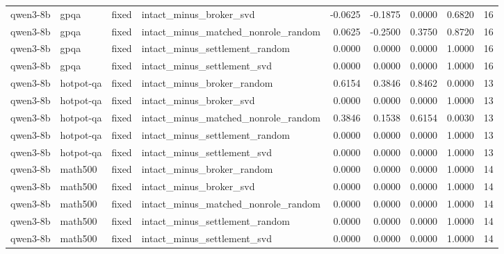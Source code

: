 \begin{table}[t]
\begin{tabular}{llllrrrrr}
qwen3-8b & gpqa & fixed & intact\_minus\_broker\_svd & -0.0625 & -0.1875 & 0.0000 & 0.6820 & 16 \\
qwen3-8b & gpqa & fixed & intact\_minus\_matched\_nonrole\_random & 0.0625 & -0.2500 & 0.3750 & 0.8720 & 16 \\
qwen3-8b & gpqa & fixed & intact\_minus\_settlement\_random & 0.0000 & 0.0000 & 0.0000 & 1.0000 & 16 \\
qwen3-8b & gpqa & fixed & intact\_minus\_settlement\_svd & 0.0000 & 0.0000 & 0.0000 & 1.0000 & 16 \\
qwen3-8b & hotpot-qa & fixed & intact\_minus\_broker\_random & 0.6154 & 0.3846 & 0.8462 & 0.0000 & 13 \\
qwen3-8b & hotpot-qa & fixed & intact\_minus\_broker\_svd & 0.0000 & 0.0000 & 0.0000 & 1.0000 & 13 \\
qwen3-8b & hotpot-qa & fixed & intact\_minus\_matched\_nonrole\_random & 0.3846 & 0.1538 & 0.6154 & 0.0030 & 13 \\
qwen3-8b & hotpot-qa & fixed & intact\_minus\_settlement\_random & 0.0000 & 0.0000 & 0.0000 & 1.0000 & 13 \\
qwen3-8b & hotpot-qa & fixed & intact\_minus\_settlement\_svd & 0.0000 & 0.0000 & 0.0000 & 1.0000 & 13 \\
qwen3-8b & math500 & fixed & intact\_minus\_broker\_random & 0.0000 & 0.0000 & 0.0000 & 1.0000 & 14 \\
qwen3-8b & math500 & fixed & intact\_minus\_broker\_svd & 0.0000 & 0.0000 & 0.0000 & 1.0000 & 14 \\
qwen3-8b & math500 & fixed & intact\_minus\_matched\_nonrole\_random & 0.0000 & 0.0000 & 0.0000 & 1.0000 & 14 \\
qwen3-8b & math500 & fixed & intact\_minus\_settlement\_random & 0.0000 & 0.0000 & 0.0000 & 1.0000 & 14 \\
qwen3-8b & math500 & fixed & intact\_minus\_settlement\_svd & 0.0000 & 0.0000 & 0.0000 & 1.0000 & 14 \\
\bottomrule
\end{tabular}

\end{table}